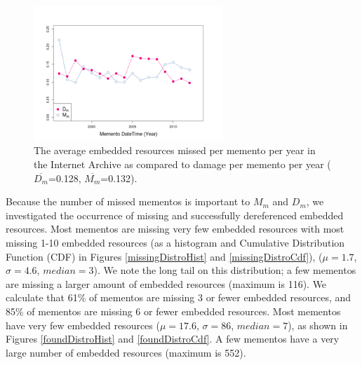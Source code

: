 
\begin{figure}[h!]
\includegraphics[width=270px]{./imgs/missedAndDamagePerYear.png}
\caption{The average embedded resources missed per memento per year in the Internet Archive as compared to damage per memento per year ($\overline{D_m}$=0.128, $\overline{M_m}$=0.132).}
\label{missingByYear}
\end{figure}


Because the number of missed mementos is important to $M_m$ and $D_m$, we investigated the occurrence of missing and successfully dereferenced embedded resources. Most mementos are missing very few embedded resources with most missing 1-10 embedded resources (as a histogram and Cumulative Distribution Function (CDF) in Figures \ref{missingDistroHist} and \ref{missingDistroCdf}), ($\mu=1.7$, $\sigma=4.6$, $median=3$). We note the long tail on this distribution; a few mementos are missing a larger amount of embedded resources (maximum is 116). We calculate that 61\% of mementos are missing 3 or fewer embedded resources, and 85\% of mementos are missing 6 or fewer embedded resources. Most mementos have very few embedded resources ($\mu=17.6$, $\sigma=86$, $median=7$), as shown in Figures \ref{foundDistroHist} and \ref{foundDistroCdf}. A few mementos have a very large number of embedded resources (maximum is 552).

